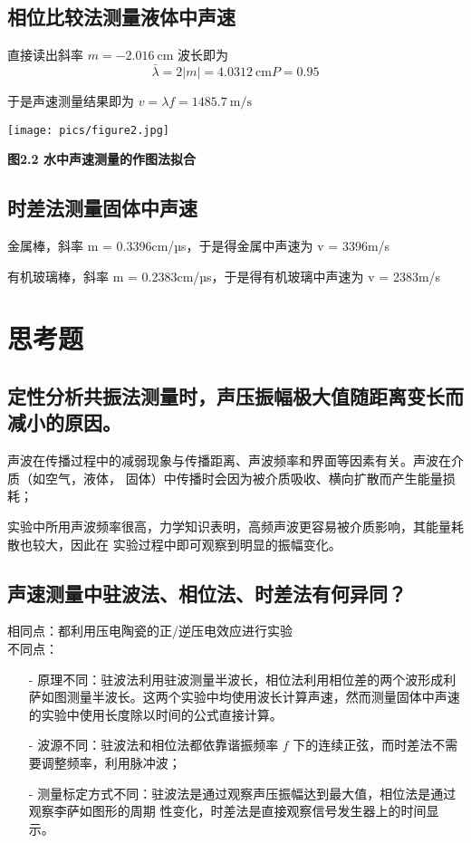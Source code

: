\documentclass[10pt,a4paper]{article}	%
\makeatletter
\newenvironment{figurehere}
{\def\@captype{figure}}
{}
\makeatother
\begin{document}
	\subsection{相位比较法测量液体中声速}

	直接读出斜率 $m=-2.016 \mathrm{~cm}$ 波长即为
	$$
	\bar{\lambda}=2|m|=4.0312 \mathrm{~cm} P=0.95
	$$

	于是声速测量结果即为 $v=\lambda f=1485.7 \mathrm{~m} / \mathrm{s}$

	\begin{figurehere}
		\vspace*{0.3em}
		\centering
		\texttt{[image: pics/figure2.jpg]}
		\caption*{\bf 图2.2 水中声速测量的作图法拟合}
		\vspace*{0.8em}
	\end{figurehere}
	
	\subsection{时差法测量固体中声速}

	金属棒，斜率 m = 0.3396cm/µs，于是得金属中声速为 v = 3396m/s

	有机玻璃棒，斜率 m = 0.2383cm/µs，于是得有机玻璃中声速为 v = 2383m/s

	\section{思考题}
	\subsection{定性分析共振法测量时，声压振幅极大值随距离变长而减小的原因。}

	声波在传播过程中的减弱现象与传播距离、声波频率和界面等因素有关。声波在介质（如空气，液体，
固体）中传播时会因为被介质吸收、横向扩散而产生能量损耗；

	实验中所用声波频率很高，力学知识表明，高频声波更容易被介质影响，其能量耗散也较大，因此在
实验过程中即可观察到明显的振幅变化。

	\subsection{声速测量中驻波法、相位法、时差法有何异同？	}

	相同点：都利用压电陶瓷的正/逆压电效应进行实验\\
	
	不同点：
	\begin{itemize}
		\item[-]  原理不同：驻波法利用驻波测量半波长，相位法利用相位差的两个波形成利萨如图测量半波长。这两个实验中均使用波长计算声速，然而测量固体中声速的实验中使用长度除以时间的公式直接计算。
		\item[-]  波源不同：驻波法和相位法都依靠谐振频率 $f$ 下的连续正弦，而时差法不需要调整频率，利用脉冲波；
		\item[-]  测量标定方式不同：驻波法是通过观察声压振幅达到最大值，相位法是通过观察李萨如图形的周期
		性变化，时差法是直接观察信号发生器上的时间显示。
	\end{itemize}
\end{document}
